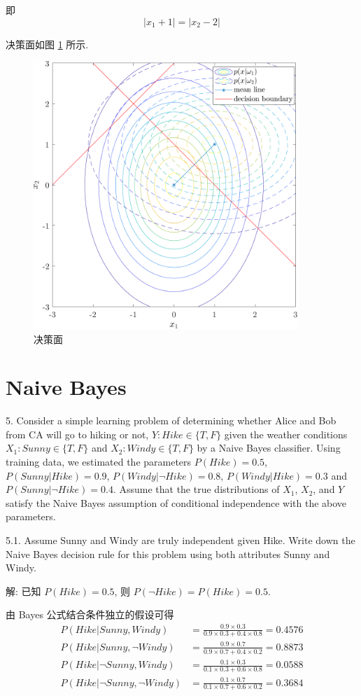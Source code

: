 \documentclass{article}
\begin{document}
即
\begin{equation}
  |x_1+1|=|x_2-2|
\end{equation}

决策面如图 \ref{fig:mvnpdf-4} 所示.

\begin{figure}[t]
  \centering
  \includegraphics[width=10cm]{mvnpdf-4.pdf}
  \caption{决策面}
  \label{fig:mvnpdf-4}
\end{figure}

\section*{Naive Bayes}


5. Consider a simple learning problem of determining whether Alice and Bob from CA will go to hiking or not, $Y:Hike\in\{T,F\}$ given the weather conditions $X_1:Sunny\in\{T,F\}$ and $X_2:Windy\in\{T,F\}$ by a Naive Bayes classifier. Using training data, we estimated the parameters $P(Hike) = 0.5$, $P(Sunny|Hike) = 0.9$, $P(Windy|\neg Hike) = 0.8$, $P(Windy|Hike) = 0.3$ and $P(Sunny|\neg Hike) = 0.4$. Assume that the true distributions of $X_1$, $X_2$, and $Y$ satisfy the Naive Bayes assumption of conditional independence with the above parameters.

5.1. Assume Sunny and Windy are truly independent given Hike. Write down the Naive Bayes decision rule for this problem using both attributes Sunny and Windy.

解: 已知 $P(Hike) = 0.5$, 则 $P(\neg Hike)=P(Hike)=0.5$. 

由 Bayes 公式结合条件独立的假设可得
\begin{equation}
  \begin{aligned}
    P(Hike|Sunny,Windy)&=\frac{0.9\times0.3}{0.9\times0.3+0.4\times0.8}=0.4576\\
    P(Hike|Sunny,\neg Windy)&=\frac{0.9\times0.7}{0.9\times0.7+0.4\times0.2}=0.8873\\
    P(Hike|\neg Sunny,Windy)&=\frac{0.1\times0.3}{0.1\times0.3+0.6\times0.8}=0.0588\\
    P(Hike|\neg Sunny,\neg Windy)&=\frac{0.1\times0.7}{0.1\times0.7+0.6\times0.2}=0.3684\\
  \end{aligned}
\end{equation}
\end{document}
